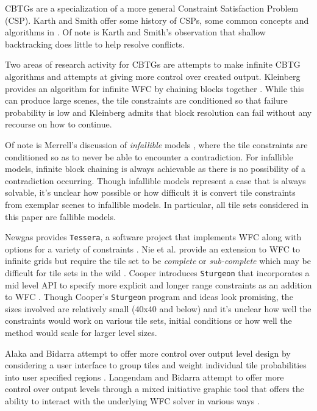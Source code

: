 CBTGs are a specialization of a more general Constraint Satisfaction Problem (CSP).
Karth and Smith offer some history of CSPs, some common concepts and algorithms in \cite{Karth_Smith_2017, Karth_Smith_2022}.
Of note is Karth and Smith's observation that shallow backtracking does little to help resolve conflicts.


Two areas of research activity for CBTGs are attempts to make infinite CBTG algorithms
and attempts at giving more control over created output.
Kleinberg provides an algorithm for infinite WFC by chaining blocks together \cite{Kleinberg_2019}.
While this can produce large scenes, the tile constraints are conditioned so that failure probability is low and Kleinberg admits
that block resolution can fail without any recourse on how to continue.

Of note is Merrell's discussion of \textit{infallible} models \cite{Merrell_2009}, where the tile constraints are
conditioned so as to never be able to encounter a contradiction.
For infallible models, infinite block chaining is always achievable as there is no possibility of a contradiction occurring.
Though infallible models represent a case that is always solvable,
it's unclear how possible or how difficult it is convert tile constraints from exemplar scenes to infallible models.
In particular, all tile sets considered in this paper are fallible models.

Newgas provides \texttt{Tessera}, a software project that implements WFC along with options for a variety of constraints \cite{Newgas_2021}.
Nie et al. provide an extension to WFC to infinite grids but require the tile set to be \textit{complete} or \textit{sub-complete}
which may be difficult for tile sets in the wild \cite{Nie_etall_2023}.
Cooper introduces \texttt{Sturgeon} that incorporates a mid level API to specify more explicit and longer range constraints as an addition
to WFC \cite{Cooper_2022}.
Though Cooper's \texttt{Sturgeon} program and ideas look promising, the sizes involved are relatively small (40x40 and below)
and it's unclear how well the constraints would work on various tile sets, initial conditions or how well the method would scale
for larger level sizes.

Alaka and Bidarra attempt to offer more control over output level design by considering a user interface to group tiles and
weight individual tile probabilities into user specified regions \cite{Alaka_Bidarra_Rafael_2023}.
Langendam and Bidarra attempt to offer more control over output levels through a mixed initiative graphic tool that offers
the ability to interact with the underlying WFC solver in various ways \cite{Langendam_etall_2022}.

